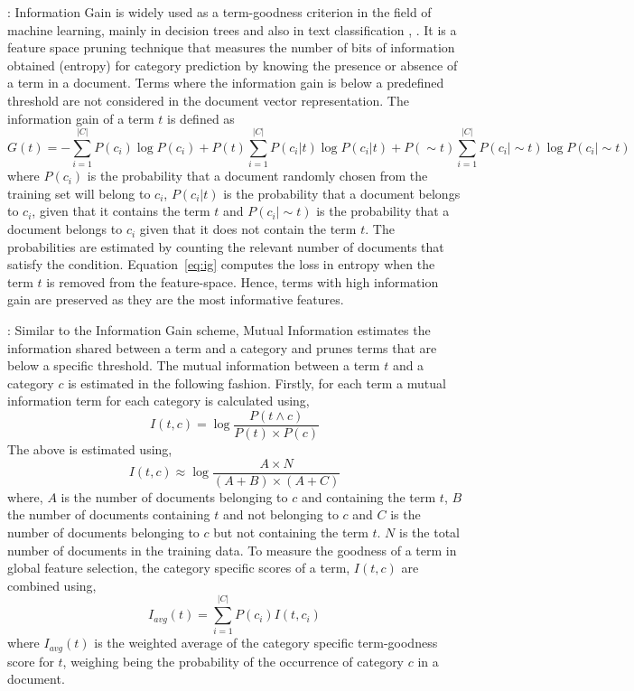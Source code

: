  : Information Gain is widely used as a 
term-goodness criterion in the field of machine learning, mainly in 
decision trees \citep{quinlan1986induction} and also in text 
classification \citep{lewis1994comparison}, \citep{moulinier1996text}. 
It is a feature space pruning technique that measures the number of 
bits of information obtained (entropy) for category prediction by 
knowing the presence or absence of a term in a document. Terms 
where the information gain is below a predefined threshold are not 
considered in the document vector representation. The information 
gain of a term $t$ is defined as
\begin{equation}
\label{eq:ig}
G(t) = -\sum_{i=1}^{|C|} P(c_{i})\log P(c_{i}) + P(t)\sum_{i=1}^{|C|} P(c_{i}|t)\log P(c_{i}|t) + P(\sim t)\sum_{i=1}^{|C|} P(c_{i}|\sim t)\log P(c_{i}|\sim t)
\end{equation}
where $P(c_{i})$ is the probability that a document randomly chosen from the training set will belong to $c_{i}$, $P(c_{i}|t)$ is the probability that a document belongs to $c_{i}$, given that it contains the term $t$ and $P(c_{i}|\sim t)$ is the probability that a document belongs to $c_{i}$ given that it does not contain the term $t$. The probabilities are estimated by counting the relevant number of documents that satisfy the condition. Equation~\ref{eq:ig} computes the loss in entropy when the term $t$ is removed from the feature-space. Hence, terms with high information gain are preserved as they are the most informative features.

 : Similar to the Information Gain scheme, Mutual Information estimates the information shared between a term and a category and prunes terms that are below a specific threshold. The mutual information between a term $t$ and a category $c$ is estimated in the following fashion. Firstly, for each term a mutual information term for each category is calculated using,
\begin{equation}
I(t,c) = \log \frac{P(t \wedge c)}{P(t) \times P(c)}
\end{equation}
The above is estimated using,
\begin{equation}
I(t,c) \approx \log \frac{A \times N}{(A + B) \times (A + C)}
\end{equation}
where, $A$ is the number of documents belonging to $c$ and containing the term $t$, $B$ the number of documents containing $t$ and not belonging to $c$ and $C$ is the number of documents belonging to $c$ but not containing the term $t$. $N$ is the total number of documents in the training data.
To measure the goodness of a term in global feature selection, the category specific scores of a term, $I(t,c)$ are combined using, 
\begin{equation}
\label{eq:ig:avg}
I_{avg}(t) = \sum_{i=1}^{|C|} P(c_{i})I(t,c_{i})
\end{equation}
where $I_{avg}(t)$ is the weighted average of the category specific term-goodness score for $t$, weighing being the probability of the occurrence of category $c$ in a document.

